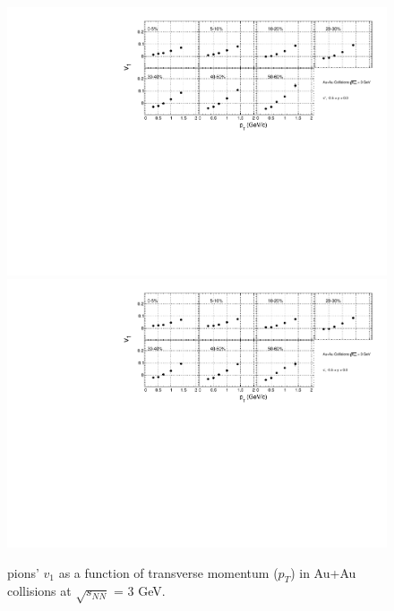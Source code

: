 \begin{figure}[h]
\includegraphics[scale=0.5]{chapter3/fig/v1ptpikp/v1pt_cent_pionp.pdf}
\includegraphics[scale=0.5]{chapter3/fig/v1ptpikp/v1pt_cent_pionm.pdf}
\caption{pions' $v_{1}$ as a function of transverse momentum ($p_{T}$) in Au+Au collisions at $\sqrt{s_{NN}}$ = 3 GeV.}
\label{pion_v1pt_cent}
\end{figure}

